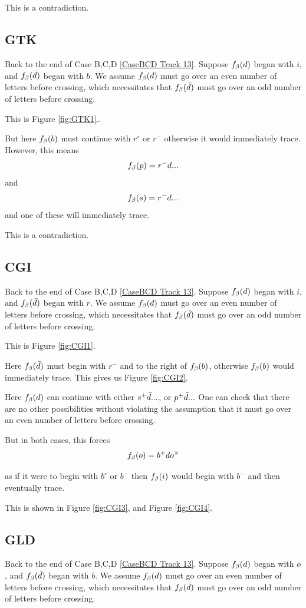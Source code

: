 This is a contradiction.

\subsection{GTK}\label{GTK}
Back to the end of Case B,C,D \ref{CaseBCD Track 13}.
Suppose $f_\beta(d)$ began with $i$, and $f_\beta(\bar{d})$ began with $b$. We assume $f_\beta(d)$ must go over an even number of letters before crossing, which necessitates that $f_\beta(\bar{d})$ must go over an odd number of letters before crossing.

This is Figure \ref{fig:GTK1}..

But here $f_\beta(b)$ must continue with $r^\circ$ or $r^-$ otherwise it would immediately trace. However, this means 
\[
f_\beta(p) = r^- d...
\]
and
\[
f_\beta(s) = r^- d...
\]
and one of these will immediately trace.

This is a contradiction.


\subsection{CGI}\label{CGI}
Back to the end of Case B,C,D \ref{CaseBCD Track 13}.
Suppose $f_\beta(d)$ began with $i$, and $f_\beta(\bar{d})$ began with $r$. We assume $f_\beta(d)$ must go over an even number of letters before crossing, which necessitates that $f_\beta(\bar{d})$ must go over an odd number of letters before crossing.

This is Figure \ref{fig:CGI1}.

Here $f_\beta(\bar{d})$ must begin with $r^-$ and to the right of $f_\beta(b)$, otherwise $f_\beta(b)$ would immediately trace. This gives us Figure \ref{fig:CGI2}.

Here $f_\beta(d)$ can continue with either $s^+ \bar{d}...$, or $p^+ \bar{d}...$ One can check that there are no other possibilities without violating the assumption that it must go over an even number of letters before crossing.

But in both cases, this forces 
\[
f_\beta(o) = b^+ d o^\times
\]

as if it were to begin with $b^\circ$ or $b^-$ then $f_\beta(i)$ would begin with $b^-$ and then eventually trace.

This is shown in Figure \ref{fig:CGI3}, and Figure \ref{fig:CGI4}.

\subsection{GLD}\label{GLD}
Back to the end of Case B,C,D \ref{CaseBCD Track 13}.
Suppose $f_\beta(d)$ began with $o$, and $f_\beta(\bar{d})$ began with $b$. We assume $f_\beta(d)$ must go over an even number of letters before crossing, which necessitates that $f_\beta(\bar{d})$ must go over an odd number of letters before crossing.

